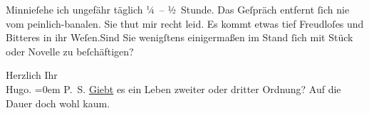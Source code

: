 \pstart
           Minnieſehe ich ungefähr täglich ¼ – ½ Stunde. Das
               Geſpräch entfernt ſich nie vom peinlich-banalen. Sie thut mir recht leid. Es kommt
               etwas tief Freudloſes und Bitteres in ihr Weſen.\hspace*{1.5em}Sind Sie wenigſtens {\pb}einigermaßen im Stand ſich mit Stück oder Novelle zu
               beſchäftigen?\pend
           
\pstart
           Herzlich Ihr{\\[\baselineskip]}\spacefill\mbox{Hugo.}\pend
           \leftskip=0em{}
\pstart
           \noindent{}\textsc{P. S.}{ }\uline{Giebt} es ein Leben zweiter oder dritter Ordnung?
                  Auf die Dauer doch wohl kaum.\pend
           \endnumbering{}  
      